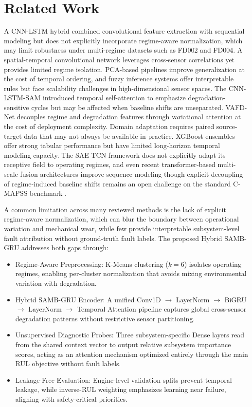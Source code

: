 \documentclass[conference]{IEEEtran}
\begin{document}
\section{Related Work}
A CNN-LSTM hybrid \cite{b2} combined convolutional feature extraction with sequential modeling but does not explicitly incorporate regime-aware normalization, which may limit robustness under multi-regime datasets such as FD002 and FD004. A spatial-temporal convolutional network \cite{b3} leverages cross-sensor correlations yet provides limited regime isolation. PCA-based pipelines \cite{b5} improve generalization at the cost of temporal ordering, and fuzzy inference systems \cite{b6} offer interpretable rules but face scalability challenges in high-dimensional sensor spaces. The CNN-LSTM-SAM \cite{b7} introduced temporal self-attention to emphasize degradation-sensitive cycles but may be affected when baseline shifts are unseparated. VAFD-Net \cite{b8} decouples regime and degradation features through variational attention at the cost of deployment complexity. Domain adaptation \cite{b9} requires paired source-target data that may not always be available in practice. XGBoost ensembles \cite{b10} offer strong tabular performance but have limited long-horizon temporal modeling capacity. The SAE-TCN framework \cite{b11} does not explicitly adapt its receptive field to operating regimes, and even recent transformer-based multi-scale fusion architectures \cite{b12} improve sequence modeling though explicit decoupling of regime-induced baseline shifts remains an open challenge on the standard C-MAPSS benchmark \cite{b13}.

A common limitation across many reviewed methods is the lack of explicit regime-aware normalization, which can blur the boundary between operational variation and mechanical wear, while few provide interpretable subsystem-level fault attribution without ground-truth fault labels. The proposed Hybrid SAMB-GRU addresses both gaps through:

\begin{itemize}
\item Regime-Aware Preprocessing: K-Means clustering ($k=6$) isolates operating regimes, enabling per-cluster normalization that avoids mixing environmental variation with degradation.
\item Hybrid SAMB-GRU Encoder: A unified Conv1D $\to$ LayerNorm $\to$ BiGRU $\to$ LayerNorm $\to$ Temporal Attention pipeline captures global cross-sensor degradation patterns without restrictive sensor partitioning.
\item Unsupervised Diagnostic Probes: Three subsystem-specific Dense layers read from the shared context vector to output relative subsystem importance scores, acting as an attention mechanism optimized entirely through the main RUL objective without fault labels.
\item Leakage-Free Evaluation: Engine-level validation splits prevent temporal leakage, while inverse-RUL weighting emphasizes learning near failure, aligning with safety-critical priorities.
\end{itemize}
\end{document}
